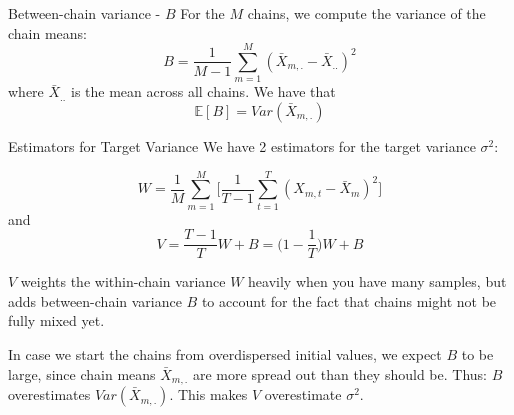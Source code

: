 \begin{frame}{Between-chain variance - $B$}
	For the $M$ chains, we compute the variance of the chain means:
	$$B = \frac{1}{M-1} \sum_{m=1}^M (\bar{X}_{m,.} - \bar{X}_{..})^2$$
	where $\bar{X}_{..}$ is the mean across all chains. We have that
	$$\mathbb{E}[B] = Var(\bar{X}_{m,.})$$
\end{frame}

\begin{frame}{Estimators for Target Variance}
	We have 2 estimators for the target variance $\sigma^2$:

	$$W  = \frac{1}{M} \sum_{m=1}^M \Big[\frac{1}{T-1} \sum_{t=1}^T (X_{m,t} - \bar{X}_m)^2\Big]$$
	and
	$$V = \frac{T-1}{T}W + B = \Big(1-\frac{1}{T}\Big)W +B$$

	\vspace{0.3cm}
	$V$ weights the within-chain variance $W$ heavily when you have many samples, but
	adds between-chain variance $B$ to account for the fact that chains might not be
	fully mixed yet.

	\vspace{0.3cm}
	In case we start the chains from overdispersed initial values, we expect $B$ to be large,
	since chain means $\bar{X}_{m,.}$ are more spread out than they should be. Thus:
	$B$ overestimates $Var(\bar{X}_{m,.})$. This makes $V$ overestimate $\sigma^2$.
\end{frame}

